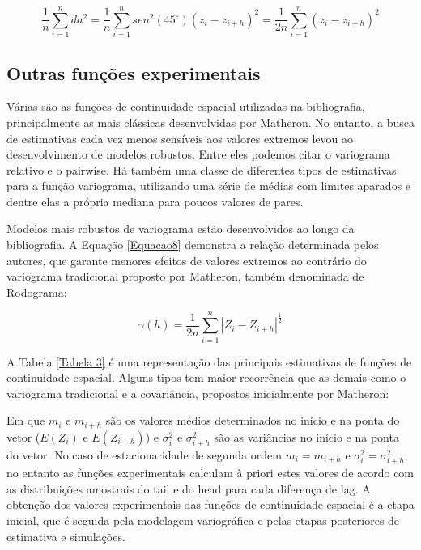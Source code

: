 \begin{equation}\label{Equacao7}
\frac{1}{n} \sum_{i=1}^{n} da^2 =\frac{1}{n} \sum_{i=1}^{n} sen^2(45^\circ)\left( z_i -z_{i+h} \right)^2 = \frac{1}{2n} \sum_{i=1}^{n} \left( z_i -z_{i+h} \right)^2
\end{equation}

\subsection{Outras funções experimentais}

Várias são as funções de continuidade espacial utilizadas na bibliografia, principalmente as mais clássicas desenvolvidas por Matheron. No entanto, a busca de estimativas cada vez menos sensíveis aos valores extremos levou ao desenvolvimento de modelos robustos. Entre eles podemos citar o variograma relativo e o pairwise. Há também uma classe de diferentes tipos de estimativas para a função variograma, utilizando uma série de médias com limites aparados e dentre elas a própria mediana para poucos valores de pares. 

Modelos mais robustos de variograma estão desenvolvidos ao longo da bibliografia. A Equação \ref{Equacao8} demonstra a relação determinada pelos autores, que garante menores efeitos de valores extremos ao contrário do variograma tradicional proposto por Matheron, também denominada de Rodograma: 

\begin{equation}\label{Equacao8}
\gamma(h) = \frac{1}{2n} \sum_{i=1}^{n} \left|  Z_i - Z_{i+h} \right| ^\frac{1}{2}
\end{equation}

A Tabela \ref{Tabela 3} é uma representação das principais estimativas de funções de continuidade espacial. Alguns tipos tem maior recorrência que as demais como o variograma tradicional e a covariância, propostos inicialmente por Matheron:

Em que $m_i$ e $m_{i+h}$ são os valores médios determinados no início e na ponta do vetor ($E(Z_i)$ e $E(Z_{i+h})$) e  $\sigma_i^2$ e $\sigma_{i+h}^2$ são as variâncias no início e na ponta do vetor. No caso de estacionaridade de segunda ordem $m_i = m_{i+h}$ e  $\sigma_i^2 = \sigma_{i+h}^2$, no entanto as funções experimentais calculam à priori estes valores de acordo com as distribuições amostrais do tail e do head para cada diferença de lag. A obtenção dos valores experimentais das funções de continuidade espacial é a etapa inicial, que é seguida pela modelagem variográfica e pelas etapas posteriores de estimativa e simulações.

